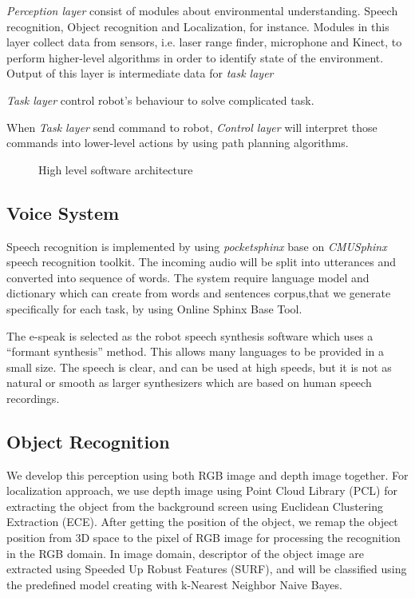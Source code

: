 \documentclass{llncs}
\newcommand{\dq}[1]{``#1''}
\begin{document}
\textit{Perception layer} consist of modules about environmental understanding. Speech recognition, Object recognition and Localization, for instance. Modules in this layer collect data from sensors, i.e. laser range finder, microphone and Kinect, to perform higher-level algorithms in order to identify state of the environment. Output of this layer is intermediate data for \textit{task layer}

\textit{Task layer} control robot's behaviour to solve complicated task.

When \textit{Task layer} send command to robot, \textit{Control layer} will interpret those commands into lower-level actions by using path planning algorithms.

\begin{figure}
\centering
\caption{High level software architecture}
\label{fig:soft_arc}
\end{figure}

\subsection{Voice System}

Speech recognition is implemented by using \textit{pocketsphinx} base on \textit{CMUSphinx} speech recognition toolkit. The incoming audio will be split into utterances and converted into sequence of words. The system require language model and dictionary which can create from words and sentences corpus,that we generate specifically for each task, by using Online Sphinx Base Tool.

The e-speak is selected as the robot speech synthesis software which uses a \dq{formant synthesis} method. This allows many languages to be provided in a small size. The speech is clear, and can be used at high speeds, but it is not as natural or smooth as larger synthesizers which are based on human speech recordings.

\subsection{Object Recognition}

We develop this perception using both RGB image and depth image together. For localization approach, we use depth image using Point Cloud Library (PCL) for extracting the object from the background screen using Euclidean Clustering Extraction (ECE). After getting the position of the object, we remap the object position from 3D space to the pixel of RGB image for processing the recognition in the RGB domain. In image domain, descriptor of the object image are extracted using Speeded Up Robust Features (SURF), and will be classified using the predefined model creating with k-Nearest Neighbor Naive Bayes.
\end{document}
